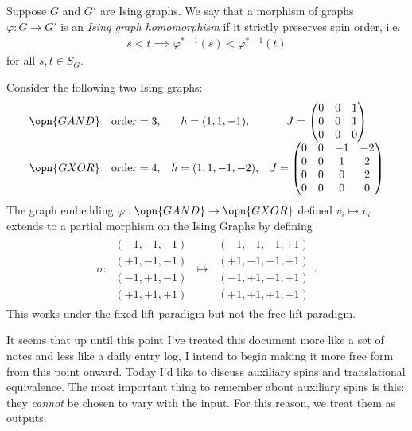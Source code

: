 \begin{defn}\label{defn:morphism-Ising-graphs}
	Suppose $G$ and $G'$ are Ising graphs. We say that a morphism of graphs $\varphi:G\to G'$ is an \emph{Ising graph homomorphism} if it strictly preserves spin order, i.e.
	\begin{align*}
		s < t \implies \varphi^{*-1}(s) < \varphi^{*-1}(t)
	\end{align*}
    for all $s,t \in S_{G}$.
\end{defn}
\begin{example}\label{example:GAND-to-GXOR}
	Consider the following two Ising graphs:
	\[
		\begin{array}{c c c c}
			\opn{GAND} & \text{order} = 3, & h = (1,1,-1), &J = \begin{pmatrix} 0 & 0 & 1 \\ 0 & 0 & 1 \\ 0 & 0 & 0 \end{pmatrix}  \\
			\opn{GXOR} & \text{order} = 4, & h = (1,1,-1,-2), & J = \begin{pmatrix} 0 & 0 & -1 & -2 \\ 0 & 0 & 1 & 2\\ 0 & 0 & 0 & 2 \\ 0 & 0 & 0 & 0 \end{pmatrix} \\
		\end{array}
	\]
	The graph embedding $\varphi:\opn{GAND} \to \opn{GXOR}$ defined $v_i \mapsto v_i$ extends to a partial morphism on the Ising Graphs by defining
	\begin{align*}
		\sigma:~
		\begin{array}{r}
			(-1,-1,-1) \\
			(+1,-1,-1) \\
			(-1,+1,-1) \\
			(+1,+1,+1)
		\end{array}~
		\longmapsto~
		\begin{array}{l}
			(-1,-1,-1,+1) \\
			(+1,-1,-1,+1) \\
			(-1,+1,-1,+1) \\
			(+1,+1,+1,+1)
		\end{array}.
	\end{align*}
	This works under the fixed lift paradigm but not the free lift paradigm.
\end{example}

It seems that up until this point I've treated this document more like a set of notes and less like a daily entry log, I intend to begin making it more free form from this point onward. Today I'd like to discuss auxiliary spins and translational equivalence. The most important thing to remember about auxiliary spins is this: they \emph{cannot} be chosen to vary with the input. For this reason, we treat them as outputs. 

